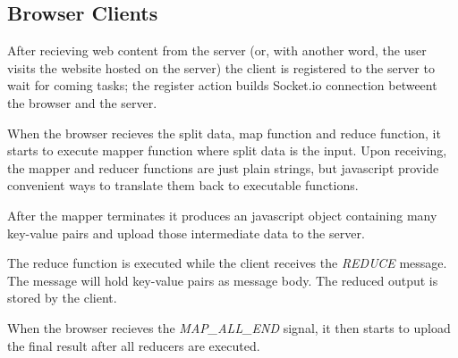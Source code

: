 \subsection{Browser Clients}

After recieving web content from the server (or, with another word, the user visits the website hosted on the server) the client is registered to the server to wait for coming tasks; the register action builds Socket.io connection betweent the browser and the server.

When the browser recieves the split data, map function and reduce function, it starts to execute mapper function where split data is the input. Upon receiving, the mapper and reducer functions are just plain strings, but javascript provide convenient ways to translate them back to executable functions.

After the mapper terminates it produces an javascript object containing many key-value pairs and upload those intermediate data to the server.

The reduce function is executed while the client receives the \emph{REDUCE} message. The message will hold key-value pairs as message body. The reduced output is stored by the client.

When the browser recieves the \emph{MAP\_ALL\_END} signal, it then starts to upload the final result after all reducers are executed.